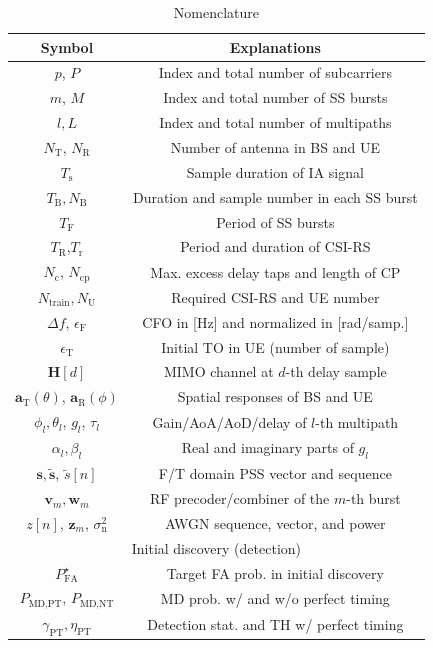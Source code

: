\documentclass[journal]{IEEEtran}
\newcommand{\tx}[0]{\text{T}}
\newcommand{\rx}[0]{\text{R}}
\newcommand{\Ts}[0]{T_{\text{s}}}
\newcommand{\Tb}[0]{T_{\text{B}}}
\newcommand{\Nb}[0]{N_{\text{B}}}
\newcommand{\Nc}[0]{N_{\text{c}}}
\newcommand{\Ncp}[0]{N_{\text{cp}}}
\newcommand{\sigman}[0]{\sigma_{\text{n}}}
\newcommand{\TSS}[0]{T_{\text{F}}}
\begin{document}
\begin{table}
\caption{Nomenclature}
\centering
\begin{tabular}{|c|c|}
\hline 
Symbol &Explanations\tabularnewline
\hline 
\hline 
$p$, $P$ &  Index and total number of subcarriers\tabularnewline
$m$, $M$ &  Index and total number of SS bursts\tabularnewline
$l, L$  & Index and total number of multipaths \tabularnewline
\hline 
$N_{\tx}$, $N_{\rx}$  & Number of antenna in BS and UE\tabularnewline
$\Ts$ &  Sample duration of IA signal\tabularnewline 
$\Tb,\Nb$ &  Duration and sample number in each SS burst\tabularnewline
$\TSS$ &  Period of SS bursts\tabularnewline
$T_{\text{R}}$,$T_{\text{r}}$ &  Period and duration of CSI-RS\tabularnewline
$\Nc$, $\Ncp$ &  Max. excess delay taps and length of CP\tabularnewline
$N_{\text{train}},N_{\text{U}}$ &  Required CSI-RS and UE number\tabularnewline
\hline 
$\Delta f$, $\epsilon_{\text{F}}$ &  CFO in [Hz] and normalized in [rad/samp.] \tabularnewline
$\epsilon_{\text{T}}$ &  Initial TO in UE (number of sample) \tabularnewline
\hline 
$\mathbf{H}[d]$ & MIMO channel at $d$-th delay sample\tabularnewline
$\mathbf{a}_{\tx}\left(\theta\right)$, $\mathbf{a}_{\rx}\left(\phi\right)$   & Spatial responses of BS and UE\tabularnewline
$\phi_l,\theta_l$, $g_l$, $\tau_l$  &Gain/AoA/AoD/delay of $l$-th multipath  \tabularnewline
$\alpha_l, \beta_l$  & Real and imaginary parts of $g_l$  \tabularnewline
\hline 
$\mathbf{s}, \tilde{\mathbf{s}}$, $\tilde{s}[n]$ & F/T domain PSS vector and sequence\tabularnewline
$\mathbf{v}_m, \mathbf{w}_m$ & RF precoder/combiner of the $m$-th burst\tabularnewline
$z[n]$, $\mathbf{z}_m$, $\sigman^2$ & AWGN sequence, vector, and power\tabularnewline
\hline 
\multicolumn{2}{|c|}{Initial discovery (detection)}\tabularnewline
\hline
$P^{\star}_{\text{FA}}$ & Target FA prob. in initial discovery \tabularnewline
$P_{\text{MD,PT}}$, $P_{\text{MD,NT}}$ & MD prob. w/ and w/o perfect timing  \tabularnewline
$\gamma_{\text{PT}}, \eta_{\text{PT}}$ & Detection stat. and TH w/ perfect timing\tabularnewline

\end{tabular}
\end{table}
\end{document}
